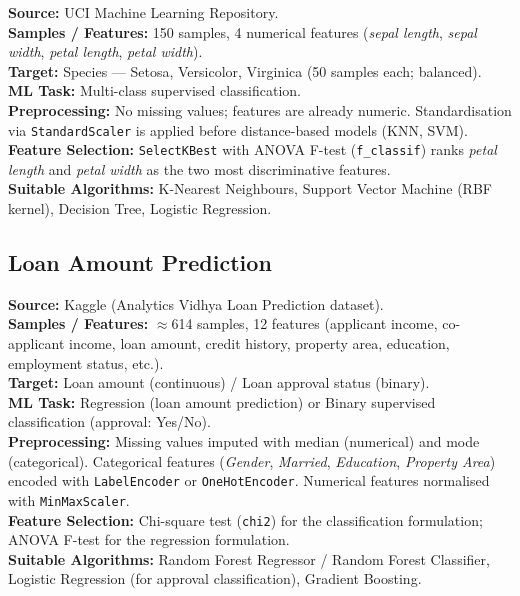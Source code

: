 \documentclass[12pt,a4paper]{article}
\begin{document}
\textbf{Source:} UCI Machine Learning Repository.\\
\textbf{Samples / Features:} 150 samples, 4 numerical features
(\textit{sepal length}, \textit{sepal width}, \textit{petal length}, \textit{petal width}).\\
\textbf{Target:} Species --- Setosa, Versicolor, Virginica (50 samples each; balanced).\\
\textbf{ML Task:} Multi-class supervised classification.\\
\textbf{Preprocessing:}
No missing values; features are already numeric. Standardisation via \texttt{StandardScaler}
is applied before distance-based models (KNN, SVM).\\
\textbf{Feature Selection:} \texttt{SelectKBest} with ANOVA F-test (\texttt{f\_classif})
ranks \textit{petal length} and \textit{petal width} as the two most discriminative features.\\
\textbf{Suitable Algorithms:} K-Nearest Neighbours, Support Vector Machine (RBF kernel),
Decision Tree, Logistic Regression.

\subsection{Loan Amount Prediction}

\textbf{Source:} Kaggle (Analytics Vidhya Loan Prediction dataset).\\
\textbf{Samples / Features:} $\approx$614 samples, 12 features (applicant income, co-applicant
income, loan amount, credit history, property area, education, employment status, etc.).\\
\textbf{Target:} Loan amount (continuous) / Loan approval status (binary).\\
\textbf{ML Task:} Regression (loan amount prediction) or Binary supervised classification
(approval: Yes/No).\\
\textbf{Preprocessing:} Missing values imputed with median (numerical) and mode (categorical).
Categorical features (\textit{Gender}, \textit{Married}, \textit{Education},
\textit{Property Area}) encoded with \texttt{LabelEncoder} or \texttt{OneHotEncoder}.
Numerical features normalised with \texttt{MinMaxScaler}.\\
\textbf{Feature Selection:} Chi-square test (\texttt{chi2}) for the classification formulation;
ANOVA F-test for the regression formulation.\\
\textbf{Suitable Algorithms:} Random Forest Regressor / Random Forest Classifier,
Logistic Regression (for approval classification), Gradient Boosting.
\end{document}
